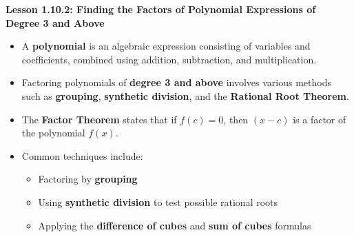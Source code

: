 \begin{center}
\textbf{Lesson 1.10.2: Finding the Factors of Polynomial Expressions of Degree 3 and Above}
\end{center}

\vspace*{-1.5ex}

\begin{itemize}
    \item A \textbf{polynomial} is an algebraic expression consisting of variables and coefficients, combined using addition, subtraction, and multiplication.
    \item Factoring polynomials of \textbf{degree 3 and above} involves various methods such as \textbf{grouping}, \textbf{synthetic division}, and the \textbf{Rational Root Theorem}.
    \item The \textbf{Factor Theorem} states that if \( f(c) = 0 \), then \( (x - c) \) is a factor of the polynomial \( f(x) \).
    \item Common techniques include:
    \begin{itemize}
        \item Factoring by \textbf{grouping}
        \item Using \textbf{synthetic division} to test possible rational roots
        \item Applying the \textbf{difference of cubes} and \textbf{sum of cubes} formulas
    \end{itemize}
\end{itemize}
